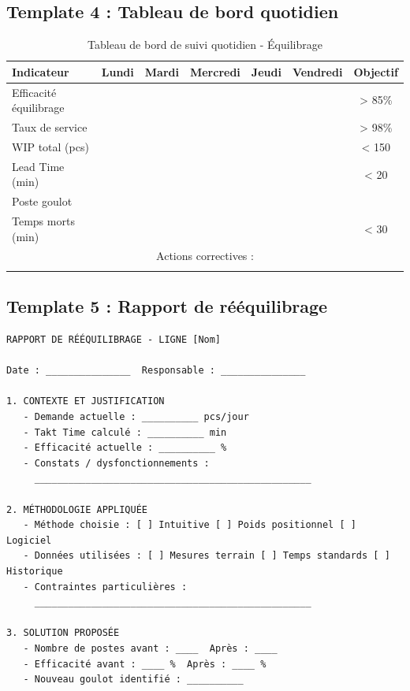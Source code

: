 \documentclass[12pt,a4paper]{article}
\begin{document}
\begin{center}
\subsection{Template 4 : Tableau de bord quotidien}

\begin{table}[H]
\centering
\caption{Tableau de bord de suivi quotidien - Équilibrage}
\label{tab:template_dashboard}
\begin{tabular}{|l|c|c|c|c|c|c|}
\hline
\textbf{Indicateur} & \textbf{Lundi} & \textbf{Mardi} & \textbf{Mercredi} & \textbf{Jeudi} & \textbf{Vendredi} & \textbf{Objectif} \\ \hline
Efficacité équilibrage & & & & & & > 85\% \\
Taux de service & & & & & & > 98\% \\
WIP total (pcs) & & & & & & < 150 \\
Lead Time (min) & & & & & & < 20 \\
Poste goulot & & & & & & \\
Temps morts (min) & & & & & & < 30 \\
\hline
\multicolumn{7}{|c|}{Actions correctives :} \\
\multicolumn{7}{|c|}{} \\
\hline
\end{tabular}
\end{table}

\subsection{Template 5 : Rapport de rééquilibrage}

\begin{verbatim}
RAPPORT DE RÉÉQUILIBRAGE - LIGNE [Nom]

Date : _______________  Responsable : _______________

1. CONTEXTE ET JUSTIFICATION
   - Demande actuelle : __________ pcs/jour
   - Takt Time calculé : __________ min
   - Efficacité actuelle : __________ %
   - Constats / dysfonctionnements :
     _________________________________________________

2. MÉTHODOLOGIE APPLIQUÉE
   - Méthode choisie : [ ] Intuitive [ ] Poids positionnel [ ] Logiciel
   - Données utilisées : [ ] Mesures terrain [ ] Temps standards [ ] Historique
   - Contraintes particulières :
     _________________________________________________

3. SOLUTION PROPOSÉE
   - Nombre de postes avant : ____  Après : ____
   - Efficacité avant : ____ %  Après : ____ %
   - Nouveau goulot identifié : __________


\end{verbatim}
\end{center}
\end{document}
